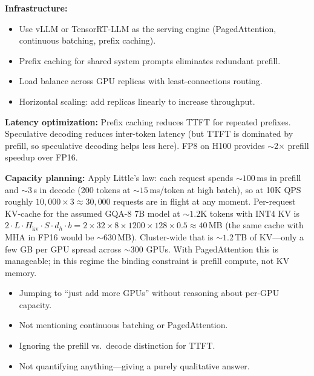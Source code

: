 \begin{interviewq}
\textbf{Infrastructure:}
\begin{itemize}
    \item Use vLLM or TensorRT-LLM as the serving engine (PagedAttention, continuous
          batching, prefix caching).
    \item Prefix caching for shared system prompts eliminates redundant prefill.
    \item Load balance across GPU replicas with least-connections routing.
    \item Horizontal scaling: add replicas linearly to increase throughput.
\end{itemize}

\textbf{Latency optimization:}  Prefix caching reduces TTFT for repeated prefixes.
Speculative decoding reduces inter-token latency (but TTFT is dominated by prefill,
so speculative decoding helps less here).  FP8 on H100 provides $\sim$2$\times$
prefill speedup over FP16.

\textbf{Capacity planning:}  Apply Little's law: each request spends ${\sim}100$\,ms in
prefill and ${\sim}3$\,s in decode (200 tokens at ${\sim}15$\,ms/token at high batch),
so at 10K QPS roughly $10{,}000 \times 3 \approx 30{,}000$ requests are in flight at any
moment.  Per-request KV-cache for the assumed GQA-8 7B model at ${\sim}1.2$K tokens with
INT4 KV is $2 \cdot L \cdot H_{\text{kv}} \cdot S \cdot d_h \cdot b = 2 \times 32 \times
8 \times 1200 \times 128 \times 0.5 \approx 40$\,MB (the same cache with MHA in FP16
would be ${\sim}630$\,MB).  Cluster-wide that is ${\sim}1.2$\,TB of KV---only a few GB
per GPU spread across ${\sim}300$ GPUs.  With PagedAttention this is manageable; in this
regime the binding constraint is prefill compute, not KV memory.

\redflags
\begin{itemize}
    \item Jumping to ``just add more GPUs'' without reasoning about per-GPU capacity.
    \item Not mentioning continuous batching or PagedAttention.
    \item Ignoring the prefill vs.\ decode distinction for TTFT.
    \item Not quantifying anything---giving a purely qualitative answer.
\end{itemize}



\end{interviewq}
